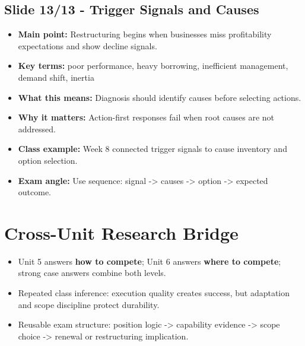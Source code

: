 \documentclass[10pt,a4paper]{article}
\newcommand{\slidebullets}[7]{%
\subsection*{#1}
\colorbox{soft}{\parbox{\dimexpr\linewidth-2\fboxsep}{%
\begin{itemize}
  \item \textbf{\textcolor{notepink}{Main point:}} #2
  \item \textbf{\textcolor{notepink}{Key terms:}} #3
  \item \textbf{\textcolor{notepink}{What this means:}} #4
  \item \textbf{\textcolor{notepink}{Why it matters:}} #5
  \item \textbf{\textcolor{notepink}{Class example:}} #6
  \item \textbf{\textcolor{notepink}{Exam angle:}} #7
\end{itemize}
}}\par
}
\begin{document}
\slidebullets{Slide 13/13 - Trigger Signals and Causes}{Restructuring begins when businesses miss profitability expectations and show decline signals.}{poor performance, heavy borrowing, inefficient management, demand shift, inertia}{Diagnosis should identify causes before selecting actions.}{Action-first responses fail when root causes are not addressed.}{Week 8 connected trigger signals to cause inventory and option selection.}{Use sequence: signal -> causes -> option -> expected outcome.}

\section*{Cross-Unit Research Bridge}
\begin{itemize}
  \item Unit 5 answers \textbf{how to compete}; Unit 6 answers \textbf{where to compete}; strong case answers combine both levels.
  \item Repeated class inference: execution quality creates success, but adaptation and scope discipline protect durability.
  \item Reusable exam structure: position logic -> capability evidence -> scope choice -> renewal or restructuring implication.
\end{itemize}
\end{document}
